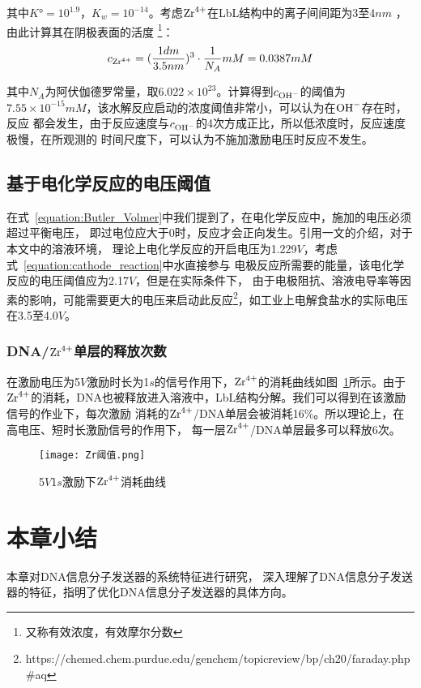 其中$K°=10^{1.9}$，$K_w=10^{-14}$。考虑$\ce{Zr^4+}$在LbL结构中的离子间间距为3至4$nm$
\cite{Shervedani2011Electrochemical}，由此计算其在阴极表面的活度
\footnote{又称有效浓度，有效摩尔分数}：
\begin{equation}
    c_{\ce{Zr^4+}}=(\frac{1dm}{3.5nm})^3\cdot \frac{1}{N_A} mM
    =0.0387mM
\end{equation}

其中$N_A$为阿伏伽德罗常量，取$6.022\times 10^{23}$。计算得到$c_{\ce{OH-}}$的阈值为
$7.55\times 10^{-15}mM$，该水解反应启动的浓度阈值非常小，可以认为在$\ce{OH-}$存在时，反应
都会发生，由于反应速度与$c_{\ce{OH-}}$的4次方成正比，所以低浓度时，反应速度极慢，在所观测的
时间尺度下，可以认为不施加激励电压时反应不发生。
\subsection{基于电化学反应的电压阈值}

在式~\ref{equation:Butler_Volmer}中我们提到了，在电化学反应中，施加的电压必须超过平衡电压，
即过电位应大于0时，反应才会正向发生。引用\parencite{C9RP00218A}一文的介绍，对于本文中的溶液环境，
理论上电化学反应的开启电压为1.229$V$，考虑式~\ref{equation:cathode_reaction}中水直接参与
电极反应所需要的能量，该电化学反应的电压阈值应为2.17$V$，但是在实际条件下，
由于电极阻抗、溶液电导率等因素的影响，可能需要更大的电压来启动此反应\footnote{
    https://chemed.chem.purdue.edu/genchem/topicreview/bp/ch20/faraday.php\#aq
}，如工业上电解食盐水的实际电压在3.5至4.0$V$。

\subsubsection{DNA/$\ce{Zr^4+}$单层的释放次数}
在激励电压为5$V$激励时长为1$s$的信号作用下，$\ce{Zr^4+}$的消耗曲线如图~\ref{5_1_Zr曲线}所示。由于
$\ce{Zr^4+}$的消耗，DNA也被释放进入溶液中，LbL结构分解。我们可以得到在该激励信号的作业下，每次激励
消耗的$\ce{Zr^4+}$/DNA单层会被消耗16\%。所以理论上，在高电压、短时长激励信号的作用下，
每一层$\ce{Zr^4+}$/DNA单层最多可以释放6次。

\begin{figure}[H]
    \centering
    \texttt{[image: Zr阈值.png]}
    \caption{5$V$1$s$激励下$\ce{Zr^4+}$消耗曲线}
    \label{5_1_Zr曲线}
\end{figure}


\section{本章小结}
本章对DNA信息分子发送器的系统特征进行研究，
深入理解了DNA信息分子发送器的特征，指明了优化DNA信息分子发送器的具体方向。

